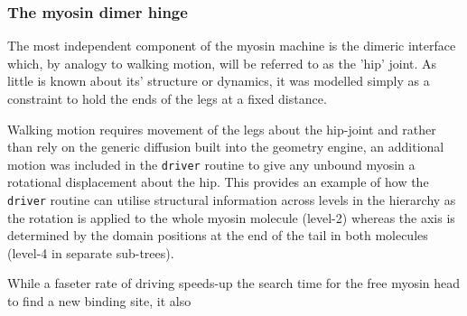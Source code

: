 \subsubsection{The myosin dimer hinge}

The most independent component of the myosin machine is the dimeric
interface which, by analogy to walking motion, will be referred to as the
'hip' joint.   As little is known about its' structure or dynamics, it
was modelled simply as a constraint to hold the ends of the legs at a
fixed distance.

Walking motion requires movement of the legs about the hip-joint and 
rather than rely on the generic diffusion built into the geometry
engine, an additional motion was included in the {\tt driver} routine
to give any unbound myosin a rotational displacement about the hip.
This provides an example of how the {\tt driver} routine can utilise
structural information across levels in the hierarchy as the rotation
is applied to the whole myosin molecule (level-2) whereas the axis
is determined by the domain positions at the end of the tail in 
both molecules (level-4 in separate sub-trees).

While a faseter rate of driving speeds-up the search time for the free
myosin head to find a new binding site, it also
